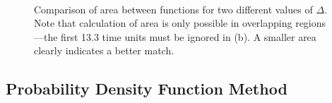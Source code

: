 \documentclass[a4paper,11pt]{article}
\begin{document}
   \begin{figure}
   \\
   \caption{Comparison of area between functions for two different values of
   $\Delta$. Note that calculation of area is only possible in overlapping
   regions---the first 13.3 time units must be ignored in (b). A smaller area
   clearly indicates a better match.}
   \label{fig:areamethod}
   \end{figure}
\subsection{Probability Density Function Method}
\label{sec-7-2}
\end{document}
